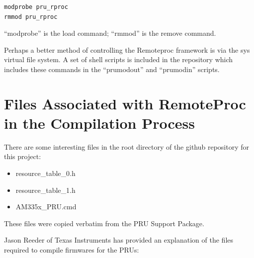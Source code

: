 \begin{verbatim}
modprobe pru_rproc
rmmod pru_rproc
\end{verbatim}

``modprobe'' is the load command; ``rmmod'' is the remove command.

Perhaps a better method of controlling the Remoteproc framework is via the sys virtual file system.  A set of shell scripts is included in the repository which includes these commands in the ``prumodout'' and ``prumodin'' scripts.

\section{Files Associated with RemoteProc in the Compilation Process}

There are some interesting files in the root directory of the github repository for this project:

\begin{itemize}
\item resource\_table\_0.h
\item resource\_table\_1.h
\item AM335x\_PRU.cmd
\end{itemize}

These files were copied verbatim from the PRU Support Package.

Jason Reeder of Texas Instruments has provided an explanation of the files required to compile firmwares for the PRUs:

